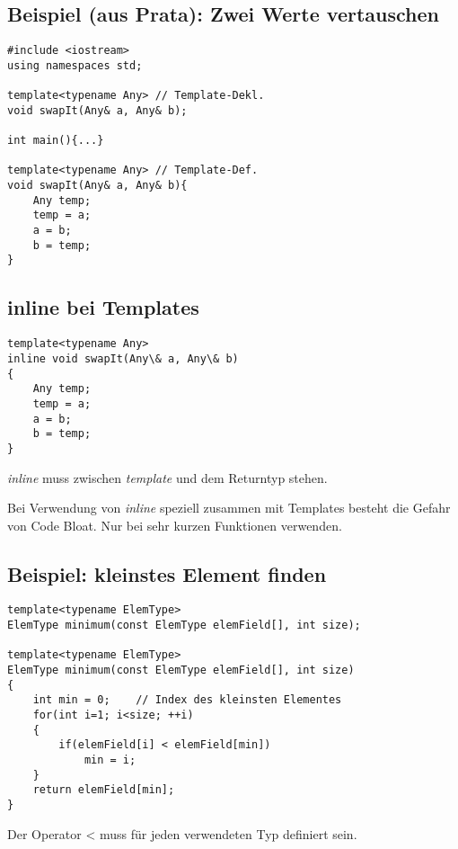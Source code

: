 \begin{multicols}{2}
\subsection{Beispiel (aus Prata): Zwei Werte vertauschen}
\begin{minipage}{\linewidth}
\vspace{-\baselineskip}
\begin{lstlisting}
#include <iostream>
using namespaces std;

template<typename Any> // Template-Dekl.
void swapIt(Any& a, Any& b);

int main(){...}

template<typename Any> // Template-Def.
void swapIt(Any& a, Any& b){
	Any temp; 
	temp = a;
	a = b;
	b = temp;
}
\end{lstlisting}
\end{minipage}
\vfill\null
\columnbreak
\subsection{inline bei Templates}
\begin{minipage}{\linewidth}
\vspace{-\baselineskip}
\begin{lstlisting}
template<typename Any>
inline void swapIt(Any\& a, Any\& b)
{
	Any temp;
	temp = a;
	a = b;
	b = temp;
}
\end{lstlisting}
\end{minipage}
\emph{inline} muss zwischen \emph{template} und dem Returntyp stehen.
\begin{achtung}
Bei Verwendung von \emph{inline} speziell zusammen mit Templates besteht die Gefahr von Code Bloat. Nur bei sehr kurzen Funktionen verwenden.	
\end{achtung}
\end{multicols}

\subsection{Beispiel: kleinstes Element finden}
\vspace{-\baselineskip}
\begin{minipage}{0.6\linewidth}
\begin{lstlisting}
template<typename ElemType>
ElemType minimum(const ElemType elemField[], int size);

template<typename ElemType>
ElemType minimum(const ElemType elemField[], int size)
{
	int min = 0;	// Index des kleinsten Elementes
	for(int i=1; i<size; ++i)
	{
		if(elemField[i] < elemField[min])
			min = i;
	}
	return elemField[min];
}
\end{lstlisting}
\end{minipage}
\begin{achtung}
Der Operator < muss für jeden verwendeten Typ definiert sein.
\end{achtung}

